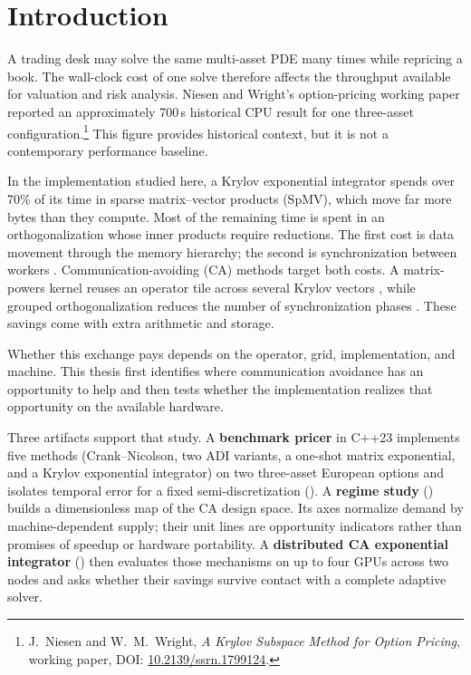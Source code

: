\section{Introduction}\label{sec:intro}

A trading desk may solve the same multi-asset PDE many times while repricing a book. The wall-clock cost of one solve therefore affects the throughput available for valuation and risk analysis. Niesen and Wright's option-pricing working paper reported an approximately 700\,s historical CPU result for one three-asset configuration.\footnote{J.~Niesen and W.~M.~Wright, \emph{A Krylov Subspace Method for Option Pricing}, working paper, DOI: \href{https://doi.org/10.2139/ssrn.1799124}{10.2139/ssrn.1799124}.} This figure provides historical context, but it is not a contemporary performance baseline.

In the implementation studied here, a Krylov exponential integrator spends over 70\% of its time in sparse matrix--vector products (SpMV), which move far more bytes than they compute. Most of the remaining time is spent in an orthogonalization whose inner products require reductions. The first cost is data movement through the memory hierarchy; the second is synchronization between workers \cite{ballard-2011,hoemmen-2010}. Communication-avoiding (CA) methods target both costs. A matrix-powers kernel reuses an operator tile across several Krylov vectors \cite{demmel-2008,mohiyuddin-2009}, while grouped orthogonalization reduces the number of synchronization phases \cite{hoemmen-2010,carson-2015}. These savings come with extra arithmetic and storage.

Whether this exchange pays depends on the operator, grid, implementation, and machine. This thesis first identifies where communication avoidance has an opportunity to help and then tests whether the implementation realizes that opportunity on the available hardware.

Three artifacts support that study. A \textbf{benchmark pricer} in C++23 implements five methods (Crank--Nicolson, two ADI variants, a one-shot matrix exponential, and a Krylov exponential integrator) on two three-asset European options and isolates temporal error for a fixed semi-discretization (). A \textbf{regime study} () builds a dimensionless map of the CA design space. Its axes normalize demand by machine-dependent supply; their unit lines are opportunity indicators rather than promises of speedup or hardware portability. A \textbf{distributed CA exponential integrator} () then evaluates those mechanisms on up to four GPUs across two nodes and asks whether their savings survive contact with a complete adaptive solver.

